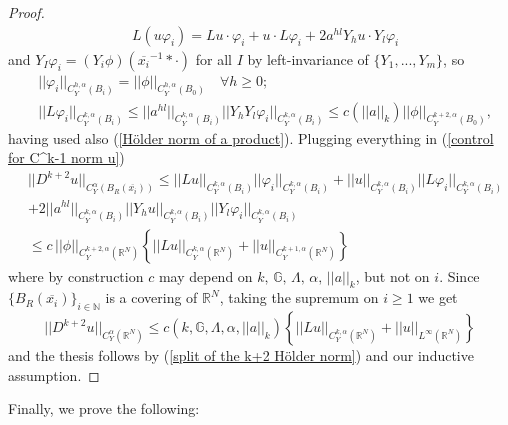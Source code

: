 \documentclass{article}
\numberwithin{equation}{section}
\begin{document}
\begin{proof}
    \begin{align*}
        & L(u \varphi_i) = Lu \cdot \varphi_i + u \cdot L \varphi_i + 2 a^{hl} Y_h u \cdot Y_l \varphi_i
    \end{align*}
    and $Y_I \varphi_i=(Y_i \phi)(\overline{x_i}^{-1} * \cdot)$ for all $I$ by left-invariance of $\{Y_1,...,Y_m\}$, so
    \begin{align*}
        & ||\varphi_i||_{C^{h,\alpha}_Y(B_i)}=||\phi||_{C^{h,\alpha}_Y(B_0)} \quad \forall h \geq 0;\\  
        & ||L \varphi_i||_{C^{k,\alpha}_Y(B_i)} \leq ||a^{hl}||_{C^{k,\alpha}_Y(B_i)} ||Y_h Y_l \varphi_i||_{C^{k,\alpha}_Y(B_i)} \leq c(||a||_k) ||\phi||_{C^{k+2,\alpha}_Y(B_0)},
    \end{align*}
    having used also (\ref{Hölder norm of a product}). Plugging everything in (\ref{control for C^k-1 norm u})
    \begin{align*}
        & ||D^{k+2} u||_{C^{\alpha}_Y(B_R(\overline{x_i}))} \leq ||Lu||_{C^{k,\alpha}_Y(B_i)} ||\varphi_i||_{C^{k,\alpha}_Y(B_i)} + ||u||_{C^{k,\alpha}_Y(B_i)} ||L \varphi_i||_{C^{k,\alpha}_Y(B_i)} \\
        & + 2||a^{hl}||_{C^{k,\alpha}_Y(B_i)} ||Y_h u||_{C^{k,\alpha}_Y(B_i)} ||Y_l \varphi_i||_{C^{k,\alpha}_Y(B_i)} \\
        & \leq c \, ||\phi||_{C^{k+2,\alpha}_Y(\mathbb{R}^{N})} \left\{ ||Lu||_{C^{k,\alpha}_Y(\mathbb{R}^{N})} + ||u||_{C^{k+1,\alpha}_Y(\mathbb{R}^{N})} \right\}
    \end{align*}
    where by construction $c$ may depend on $k,\, \mathbb{G},\,  \Lambda, \, \alpha, \, ||a||_k$, but not on $i$. Since $\{B_R(\overline{x_i})\}_{i \in \mathbb{N}}$ is a covering of $\mathbb{R}^N$, taking the supremum on $i \geq 1$ we get
    \begin{equation*}
        ||D^{k+2} u||_{C^{\alpha}_Y(\mathbb{R}^N)} \leq c(k,\mathbb{G}, \Lambda, \alpha, ||a||_k) \left\{ ||Lu||_{C^{k,\alpha}_Y(\mathbb{R}^N)} + ||u||_{L^{\infty}(\mathbb{R}^N)} \right\}
    \end{equation*}
    and the thesis follows by (\ref{split of the k+2 Hölder norm}) and our inductive assumption.
\end{proof}

\vspace{2mm}

Finally, we prove the following:

\vspace{2mm}
\end{document}

